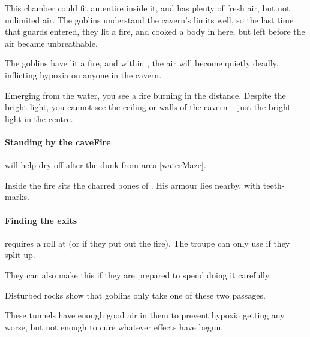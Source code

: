 \begin{multicols}{2}


\begin{exampletext}
  This chamber could fit an entire  inside it, and has plenty of fresh air, but not unlimited air.
  The goblins understand the cavern's limits well, so the last time that \glspl{guard} entered, they lit a fire, and cooked a body in here, but left before the air became unbreathable.
\end{exampletext}

The goblins have lit a fire, and within , the air will become quietly deadly, inflicting \gls{hypoxia} on anyone in the cavern.

\begin{boxtext}
  Emerging from the water, you see a fire burning in the distance.
  Despite the bright light, you cannot see the ceiling or walls of the cavern -- just the bright light in the centre.
\end{boxtext}

\paragraph{Standing by the \gls{caveFire}}
will help dry off after the dunk from area \ref{waterMaze}.

Inside the fire sits the charred bones of .
His armour lies nearby, with teeth-marks.

\paragraph{Finding the exits}
requires a  roll at \tn[9] (or \tn[14] if they put out the fire).
The troupe can only use  if they split up.

They can also make this  if they are prepared to spend  doing it carefully.


Disturbed rocks show that goblins only take one of these two passages.

These tunnels have enough good air in them to prevent \gls{hypoxia} getting any worse, but not enough to cure whatever effects have begun.


\end{multicols}
